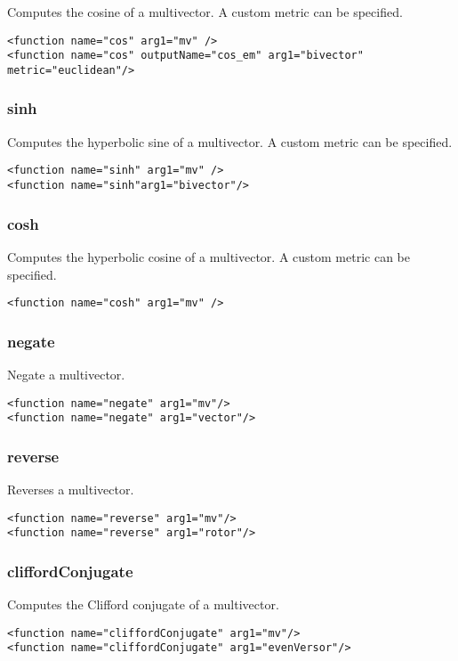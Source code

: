 \documentclass[10pt, a4paper]{article}
\begin{document}
Computes the cosine of a multivector.
A custom metric can be specified.
\begin{verbatim}
<function name="cos" arg1="mv" />
<function name="cos" outputName="cos_em" arg1="bivector" metric="euclidean"/>
\end{verbatim}

\subsubsection*{sinh}

Computes the hyperbolic sine of a multivector.
A custom metric can be specified.
\begin{verbatim}
<function name="sinh" arg1="mv" />
<function name="sinh"arg1="bivector"/>
\end{verbatim}

\subsubsection*{cosh}

Computes the hyperbolic cosine of a multivector.
A custom metric can be specified.
\begin{verbatim}
<function name="cosh" arg1="mv" />
\end{verbatim}

\subsubsection*{negate}

Negate a multivector.
\begin{verbatim}
<function name="negate" arg1="mv"/>
<function name="negate" arg1="vector"/>
\end{verbatim}

\subsubsection*{reverse}

Reverses a multivector.
\begin{verbatim}
<function name="reverse" arg1="mv"/>
<function name="reverse" arg1="rotor"/>
\end{verbatim}

\subsubsection*{cliffordConjugate}

Computes the Clifford conjugate of a multivector.
\begin{verbatim}
<function name="cliffordConjugate" arg1="mv"/>
<function name="cliffordConjugate" arg1="evenVersor"/>
\end{verbatim}
\end{document}
